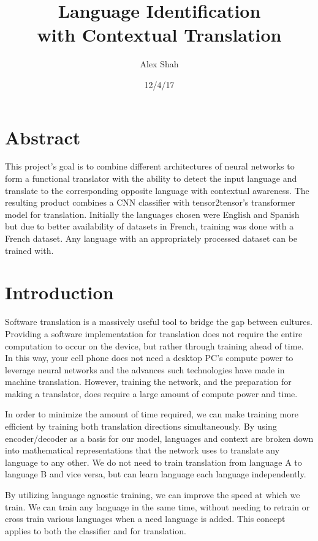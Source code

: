 \documentclass[10pt,a4paper]{article}
\begin{document}
\title{Language Identification \\ with Contextual Translation}
\author{Alex Shah}
\date{12/4/17}

\maketitle

\section{Abstract}
   This project's goal is to combine different architectures of neural networks to form a functional translator with the ability to detect the input language and translate to the corresponding opposite language with contextual awareness. The resulting product combines a CNN classifier with tensor2tensor's transformer model for translation. Initially the languages chosen were English and Spanish but due to better availability of datasets in French, training was done with a French dataset. Any language with an appropriately processed dataset can be trained with.

\section{Introduction}
  Software translation is a massively useful tool to bridge the gap between cultures. Providing a software implementation for translation does not require the entire computation to occur on the device, but rather through training ahead of time. In this way, your cell phone does not need a desktop PC's compute power to leverage neural networks and the advances such technologies have made in machine translation. However, training the network, and the preparation for making a translator, does require a large amount of compute power and time.

  In order to minimize the amount of time required, we can make training more efficient by training both translation directions simultaneously. By using encoder/decoder as a basis for our model, languages and context are broken down into mathematical representations that the network uses to translate any language to any other. We do not need to train translation from language A to language B and vice versa, but can learn language each language independently.

  By utilizing language agnostic training, we can improve the speed at which we train. We can train any language in the same time, without needing to retrain or cross train various languages when a need language is added. This concept applies to both the classifier and for translation. 
\end{document}
